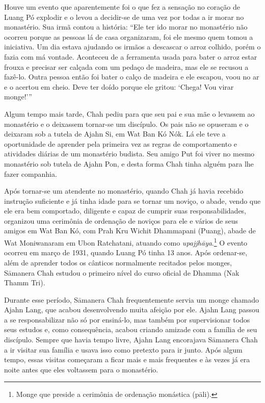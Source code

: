 Houve um evento que aparentemente foi o que fez a sensação no coração de
Luang Pó explodir e o levou a decidir-se de uma vez por todas a ir morar
no monastério. Sua irmã contou a história: ``Ele ter ido morar no
monastério não ocorreu porque as pessoas lá de casa organizaram, foi ele
mesmo quem tomou a iniciativa. Um dia estava ajudando os irmãos a
descascar o arroz colhido, porém o fazia com má vontade. Aconteceu de a
ferramenta usada para bater o arroz estar frouxa e precisar ser calçada
com um pedaço de madeira, mas ele se recusou a fazê-lo. Outra pessoa
então foi bater o calço de madeira e ele escapou, voou no ar e o acertou
em cheio. Deve ter doído porque ele gritou: `Chega! Vou virar monge!'''

Algum tempo mais tarde, Chah pediu para que seu pai e sua mãe o levassem
ao monastério e o deixassem tornar-se um discípulo. Os pais não se
opuseram e o deixaram sob a tutela de Ajahn Si, em Wat Ban Kó Nók. Lá
ele teve a oportunidade de aprender pela primeira vez as regras de
comportamento e atividades diárias de um monastério budista. Seu amigo
Put foi viver no mesmo monastério sob tutela de Ajahn Pon, e desta forma
Chah tinha alguém para lhe fazer companhia.

Após tornar-se um atendente no monastério, quando Chah já havia recebido
instrução suficiente e já tinha idade para se tornar um noviço, o abade,
vendo que ele era bem comportado, diligente e capaz de cumprir suas
responsabilidades, organizou uma cerimônia de ordenação de noviços para
ele e vários de seus amigos em Wat Ban Kó, com Prah Kru Wichit
Dhammapani (Puang), abade de Wat Moniwanaram em Ubon Ratchatani, atuando
como \emph{upajjhāya}.\footnote{Monge que preside a cerimônia de
  ordenação monástica (pāli).} O evento ocorreu em março de
1931, quando Luang Pó tinha 13 anos. Após ordenar-se, além de aprender
todos os cânticos normalmente recitados pelos monges, Sāmanera Chah
estudou o primeiro nível do curso oficial de Dhamma (Nak Thamm
Tri).

Durante esse período, Sāmanera Chah frequentemente servia um monge
chamado Ajahn Lang, que acabou desenvolvendo muita afeição por ele.
Ajahn Lang passou a se responsabilizar não só por ensiná-lo, mas também
por supervisionar todos seus estudos e, como consequência, acabou
criando amizade com a família de seu discípulo. Sempre que havia tempo
livre, Ajahn Lang encorajava Sāmanera Chah a ir visitar sua família e
usava isso como pretexto para ir junto. Após algum tempo, essas visitas
começaram a ficar mais e mais frequentes e às vezes já era noite antes
que eles voltassem para o monastério.

